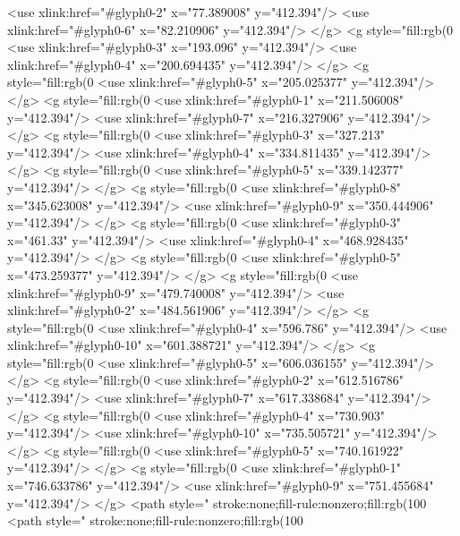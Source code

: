   <use xlink:href="#glyph0-2" x="77.389008" y="412.394"/>
  <use xlink:href="#glyph0-6" x="82.210906" y="412.394"/>
</g>
<g style="fill:rgb(0%
  <use xlink:href="#glyph0-3" x="193.096" y="412.394"/>
  <use xlink:href="#glyph0-4" x="200.694435" y="412.394"/>
</g>
<g style="fill:rgb(0%
  <use xlink:href="#glyph0-5" x="205.025377" y="412.394"/>
</g>
<g style="fill:rgb(0%
  <use xlink:href="#glyph0-1" x="211.506008" y="412.394"/>
  <use xlink:href="#glyph0-7" x="216.327906" y="412.394"/>
</g>
<g style="fill:rgb(0%
  <use xlink:href="#glyph0-3" x="327.213" y="412.394"/>
  <use xlink:href="#glyph0-4" x="334.811435" y="412.394"/>
</g>
<g style="fill:rgb(0%
  <use xlink:href="#glyph0-5" x="339.142377" y="412.394"/>
</g>
<g style="fill:rgb(0%
  <use xlink:href="#glyph0-8" x="345.623008" y="412.394"/>
  <use xlink:href="#glyph0-9" x="350.444906" y="412.394"/>
</g>
<g style="fill:rgb(0%
  <use xlink:href="#glyph0-3" x="461.33" y="412.394"/>
  <use xlink:href="#glyph0-4" x="468.928435" y="412.394"/>
</g>
<g style="fill:rgb(0%
  <use xlink:href="#glyph0-5" x="473.259377" y="412.394"/>
</g>
<g style="fill:rgb(0%
  <use xlink:href="#glyph0-9" x="479.740008" y="412.394"/>
  <use xlink:href="#glyph0-2" x="484.561906" y="412.394"/>
</g>
<g style="fill:rgb(0%
  <use xlink:href="#glyph0-4" x="596.786" y="412.394"/>
  <use xlink:href="#glyph0-10" x="601.388721" y="412.394"/>
</g>
<g style="fill:rgb(0%
  <use xlink:href="#glyph0-5" x="606.036155" y="412.394"/>
</g>
<g style="fill:rgb(0%
  <use xlink:href="#glyph0-2" x="612.516786" y="412.394"/>
  <use xlink:href="#glyph0-7" x="617.338684" y="412.394"/>
</g>
<g style="fill:rgb(0%
  <use xlink:href="#glyph0-4" x="730.903" y="412.394"/>
  <use xlink:href="#glyph0-10" x="735.505721" y="412.394"/>
</g>
<g style="fill:rgb(0%
  <use xlink:href="#glyph0-5" x="740.161922" y="412.394"/>
</g>
<g style="fill:rgb(0%
  <use xlink:href="#glyph0-1" x="746.633786" y="412.394"/>
  <use xlink:href="#glyph0-9" x="751.455684" y="412.394"/>
</g>
<path style=" stroke:none;fill-rule:nonzero;fill:rgb(100%
<path style=" stroke:none;fill-rule:nonzero;fill:rgb(100%
